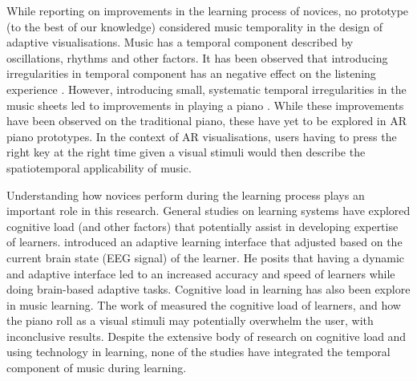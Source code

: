 \documentclass[manuscript,screen]{acmart}
\begin{document}
While reporting on improvements in the learning process of novices, no prototype (to the best of our knowledge) considered music temporality in the design of adaptive visualisations. Music has a temporal component described by oscillations, rhythms and other factors. It has been observed that introducing irregularities in temporal component has an negative effect on the listening experience \cite{lippman1984progressive}. However, introducing  small, systematic temporal irregularities in the music sheets led to improvements in playing a piano \cite{large2002perceiving}. While these improvements have been observed on the traditional piano, these have yet to be explored in AR piano prototypes. In the context of AR visualisations, users having to press the right key at the right time given a visual stimuli would then describe the spatiotemporal applicability of music.
 
Understanding how novices perform during the learning process plays an important role in this research. General studies on learning systems have explored cognitive load (and other factors) that potentially assist in developing expertise of learners. \citet{yuksel2016learn} introduced an adaptive learning interface that adjusted based on the current brain state (EEG signal) of the learner. He posits that having a dynamic and adaptive interface led to an increased accuracy and speed of learners while doing brain-based adaptive tasks.   
Cognitive load in learning has also  been explore in music learning. 
The work of \citet{klepsch2017development} measured the cognitive load of learners, and how the piano roll as a visual stimuli may potentially overwhelm the user, with inconclusive results.
Despite the extensive body of research on cognitive load and using technology in learning, none of the studies have integrated the temporal component of music during learning.  
\end{document}
